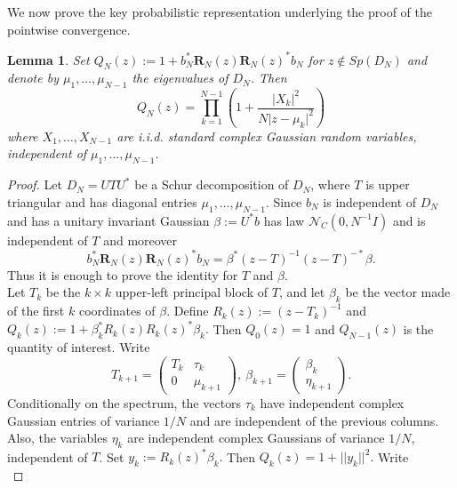 \documentclass[12pt,a4paper]{amsart}
\theoremstyle{plain} %
\newtheorem{lemma}[theorem]{Lemma}
\begin{document}
We now prove the key probabilistic representation underlying the proof of the pointwise convergence.
\begin{lemma}
   Set $Q_N(z):=1+b_N^*\mathbf{R}_{N}(z)\mathbf{R}_{N}(z)^*b_N$ for $z \notin Sp (D_N)$ and denote by $\mu_1,\ldots,\mu_{N-1}$ the eigenvalues of $D_N$. Then 
   \begin{equation*}
       Q_N(z) \overset{}{=} \prod_{k=1}^{N-1}\left(1+\frac{\lvert X_k\lvert^2}{N\lvert z- \mu_k \lvert^2}\right)
   \end{equation*}
   where $X_1,\ldots,X_{N-1}$ are i.i.d. standard complex Gaussian random variables, independent of $\mu_1,\ldots,\mu_{N-1}.$
\end{lemma}
\begin{proof}
    Let $D_N=UTU^*$ be a Schur decomposition of $D_N$, where $T$ is upper triangular and has diagonal entries $\mu_1,\ldots, \mu_{N-1}$. Since $b_N$ is independent of $D_N$ and has a unitary invariant Gaussian $\beta:=U^*b$ has law $\mathcal{N}_{C}(0,N^{-1}I)$ and is independent of $T$ and moreover 
    \begin{equation*}
        b_N^*\mathbf{R}_{N}(z)\mathbf{R}_{N}(z)^*b_N=\beta ^*(z-T)^{-1}(z-T)^{-*}\beta.
    \end{equation*}
    Thus it is enough to prove the identity for $T$ and $\beta$. \\
    Let $T_k $ be the $k\times k$ upper-left principal block of $T$, and let $\beta_k$ be the vector made of the first $k$ coordinates of $\beta.$ Define $R_k(z):=(z-T_k)^{-1}$ and $Q_k(z):=1+\beta_k^* R_k(z)R_k(z)^*\beta_k.$ Then $Q_0(z)=1$ and $Q_{N-1}(z)$ is the quantity of interest. Write 
    \begin{equation*}
        T_{k+1}= \begin{pmatrix}
        T_k&\tau_k\\
        0&\mu_{k+1}
    \end{pmatrix}, \ \beta_{k+1}=\begin{pmatrix}
        \beta_k\\
        \eta_{k+1}
    \end{pmatrix}.
    \end{equation*}
    Conditionally on the spectrum, the vectors $\tau_k$ have independent complex Gaussian entries of variance $1/N$ and are independent of the previous columns. Also, the variables $\eta_k$ are independent complex Gaussians of variance $1/N$, independent of $T$. Set $y_k:=R_k(z)^*\beta_k.$ Then $Q_k(z)=1+ \lvert \lvert y_k \lvert \lvert ^2.$ Write 
    \begin{equation*}

\end{equation*}
\end{proof}
\end{document}
